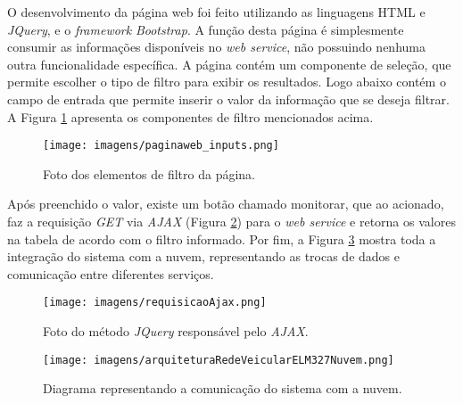 O desenvolvimento da página web foi feito utilizando as linguagens HTML e \textit{JQuery}, e o \textit{framework} \textit{Bootstrap}. A função desta página é simplesmente consumir as informações disponíveis no \textit{web service}, não possuindo nenhuma outra funcionalidade específica. A página contém um componente de seleção, que permite escolher o tipo de filtro para exibir os resultados. Logo abaixo contém o campo de entrada que permite inserir o valor da informação que se deseja filtrar. A Figura \ref{Fig:input_fitros} apresenta os componentes de filtro mencionados acima.

\begin{figure}[!ht]
\centering
\caption{Foto dos elementos de filtro da página.} 
{\texttt{[image: imagens/paginaweb\_inputs.png]}}\\
 \label{Fig:input_fitros}
\end{figure}

Após preenchido o valor, existe um botão chamado monitorar, que ao acionado, faz a requisição \textit{GET} via \textit{AJAX} (Figura \ref{Fig:requisicao_ajax}) para o \textit{web service} e retorna os valores na tabela de acordo com o filtro informado.
Por fim, a Figura \ref{Fig:arquitetura_projeto} mostra toda a integração do sistema com a nuvem, representando as trocas de dados e comunicação entre diferentes serviços.

\begin{figure}[!ht]
\centering
\caption{Foto do método \textit{JQuery} responsável pelo \textit{AJAX}.} 
{\texttt{[image: imagens/requisicaoAjax.png]}}\\
 \label{Fig:requisicao_ajax}
\end{figure}

\begin{figure}[!ht]
\centering
\caption{Diagrama representando a comunicação do sistema com a nuvem.} 
{\texttt{[image: imagens/arquiteturaRedeVeicularELM327Nuvem.png]}}\\
 \label{Fig:arquitetura_projeto}
\end{figure}
